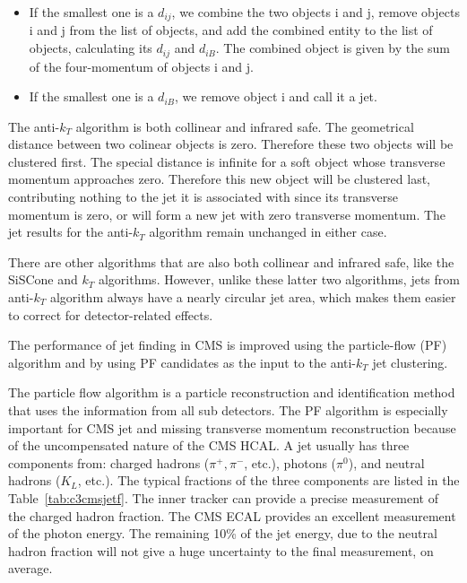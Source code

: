 \begin{itemize}
  \item If the smallest one is a $d_{ij}$, we combine the two objects i and j, remove objects i and j from the list of objects, and add the combined entity to the list of objects, calculating its $d_{ij}$ and $d_{iB}$. The combined object is given by the sum of the four-momentum of objects i and j.
  \item If the smallest one is a $d_{iB}$, we remove object i and call it a jet.
\end{itemize}

The anti-$k_{T}$ algorithm is both collinear and infrared safe. The geometrical distance between two colinear objects is zero. Therefore these two objects will be clustered first. The special distance is infinite for a soft object whose transverse momentum approaches zero. Therefore this new object will be clustered last, contributing nothing to the jet it is associated with since its transverse momentum is zero, or will form a new jet with zero transverse momentum. The jet results for the anti-$k_{T}$ algorithm remain unchanged in either case. 

There are other algorithms that are also both collinear and infrared safe, like the SiSCone\cite{Salam:2007xv} and $k_{T}$\cite{Cacciari:2005hq} algorithms. However, unlike these latter two algorithms, jets from anti-$k_{T}$ algorithm always have a nearly circular jet area\cite{Cacciari:2008gn}, which makes them easier to correct for detector-related effects.

The performance of jet finding in CMS is improved using the particle-flow (PF) algorithm\cite{CMS-PAS-PFT-09-001} and by using PF candidates as the input to the anti-$k_{T}$ jet clustering. 

The particle flow algorithm is a particle reconstruction and identification method that uses the information from all sub detectors. The PF algorithm is especially important for CMS jet and missing transverse momentum reconstruction because of the uncompensated nature of the CMS HCAL. A jet usually has three components from: charged hadrons ($\pi^{+},\pi^{-}$, etc.), photons ($\pi^{0}$), and neutral hadrons ($K_{L}$, etc.). The typical fractions of the three components are listed in the Table~\ref{tab:c3cmsjetf}. The inner tracker can provide a precise measurement of the charged hadron fraction. The CMS ECAL provides an excellent measurement of the photon energy. The remaining 10\% of the jet energy, due to the neutral hadron fraction will not give a huge uncertainty to the final measurement, on average. 

